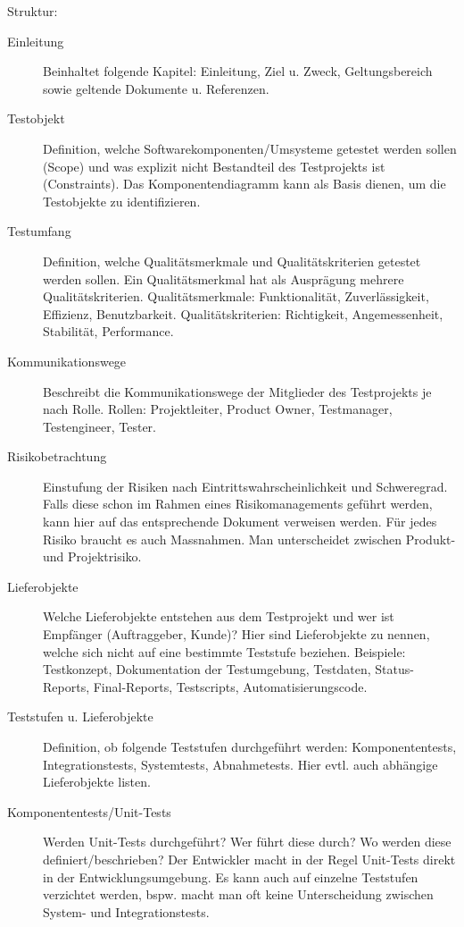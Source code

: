 Struktur:
\begin{description}
	\item[Einleitung] Beinhaltet folgende Kapitel: Einleitung, Ziel u. Zweck, Geltungsbereich sowie geltende Dokumente u. Referenzen.
	
	\item[Testobjekt] Definition, welche Softwarekomponenten/Umsysteme getestet werden sollen (Scope) und was explizit nicht Bestandteil des Testprojekts ist (Constraints). Das Komponentendiagramm kann als Basis dienen, um die Testobjekte zu identifizieren.
	
	\item[Testumfang] Definition, welche Qualitätsmerkmale und Qualitätskriterien getestet werden sollen. Ein Qualitätsmerkmal hat als Ausprägung mehrere Qualitätskriterien. Qualitätsmerkmale: Funktionalität, Zuverlässigkeit, Effizienz, Benutzbarkeit. Qualitätskriterien: Richtigkeit, Angemessenheit, Stabilität, Performance.
	
	\item[Kommunikationswege] Beschreibt die Kommunikationswege der Mitglieder des Testprojekts je nach Rolle. Rollen: Projektleiter, Product Owner, Testmanager, Testengineer, Tester.
	
	\item[Risikobetrachtung] Einstufung der Risiken nach Eintrittswahrscheinlichkeit und Schweregrad. Falls diese schon im Rahmen eines Risikomanagements geführt werden, kann hier auf das entsprechende Dokument verweisen werden. Für jedes Risiko braucht es auch Massnahmen. Man unterscheidet zwischen Produkt- und Projektrisiko.
	
	\item[Lieferobjekte] Welche Lieferobjekte entstehen aus dem Testprojekt und wer ist Empfänger (Auftraggeber, Kunde)?  Hier sind Lieferobjekte zu nennen, welche sich nicht auf eine bestimmte Teststufe beziehen. Beispiele: Testkonzept, Dokumentation der Testumgebung, Testdaten, Status-Reports, Final-Reports, Testscripts, Automatisierungscode.
	
	\item[Teststufen u. Lieferobjekte] Definition, ob folgende Teststufen durchgeführt werden: Komponententests, Integrationstests, Systemtests, Abnahmetests.  Hier evtl. auch abhängige Lieferobjekte listen.
	
	\item[Komponententests/Unit-Tests] Werden Unit-Tests durchgeführt? Wer führt diese durch? Wo werden diese definiert/beschrieben? Der Entwickler macht in der Regel Unit-Tests direkt in der Entwicklungsumgebung. Es kann auch auf einzelne Teststufen verzichtet werden, bspw. macht man oft keine Unterscheidung zwischen System- und Integrationstests.
	

\end{description}
